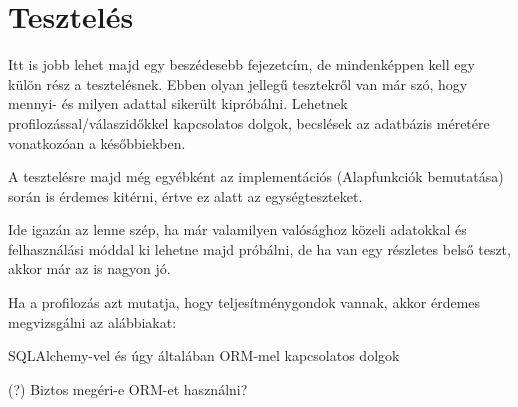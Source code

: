 \chapter{Tesztelés}

Itt is jobb lehet majd egy beszédesebb fejezetcím, de mindenképpen kell egy külön rész a tesztelésnek. Ebben olyan jellegű tesztekről van már szó, hogy mennyi- és milyen adattal sikerült kipróbálni. Lehetnek profilozással/válaszidőkkel kapcsolatos dolgok, becslések az adatbázis méretére vonatkozóan a későbbiekben.

A tesztelésre majd még egyébként az implementációs (Alapfunkciók bemutatása) során is érdemes kitérni, értve ez alatt az egységteszteket.

Ide igazán az lenne szép, ha már valamilyen valósághoz közeli adatokkal és felhasználási móddal ki lehetne majd próbálni, de ha van egy részletes belső teszt, akkor már az is nagyon jó.

Ha a profilozás azt mutatja, hogy teljesítménygondok vannak, akkor érdemes megvizsgálni az alábbiakat:

SQLAlchemy-vel és úgy általában ORM-mel kapcsolatos dolgok

(?) Biztos megéri-e ORM-et használni?
